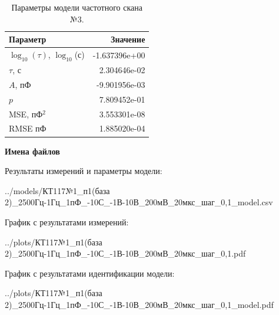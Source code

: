 \begin{table}[!ht]
    \centering
    \caption{Параметры модели частотного скана №3.}
    \begin{tabular}{|l|r|}
        \hline
        Параметр                                       & Значение                  \\ \hline
        $\log_{10}(\tau)$, $\log_{10}$(с)              & -1.637396e+00             \\ \hline
        $\tau$, с                                      & 2.304646e-02              \\ \hline
        $A$, пФ                                        & -9.901956e-03             \\ \hline
        $p$                                            & 7.809452e-01              \\ \hline
        MSE, пФ$^2$                                    & 3.553301e-08              \\ \hline
        RMSE пФ                                        & 1.885020e-04              \\ \hline
    \end{tabular}
    \label{table:frequency_scan_model_3}
\end{table}

\textbf{Имена файлов}

Результаты измерений и параметры модели:

\scriptsize../models/КТ117№1\_п1(база 2)\_2500Гц-1Гц\_1пФ\_-10С\_-1В-10В\_200мВ\_20мкс\_шаг\_0,1\_model.csv
\normalsize

График с результатами измерений:

\scriptsize../plots/КТ117№1\_п1(база 2)\_2500Гц-1Гц\_1пФ\_-10С\_-1В-10В\_200мВ\_20мкс\_шаг\_0,1.pdf
\normalsize

График с результатами идентификации модели:

\scriptsize../plots/КТ117№1\_п1(база 2)\_2500Гц-1Гц\_1пФ\_-10С\_-1В-10В\_200мВ\_20мкс\_шаг\_0,1\_model.pdf
\normalsize

